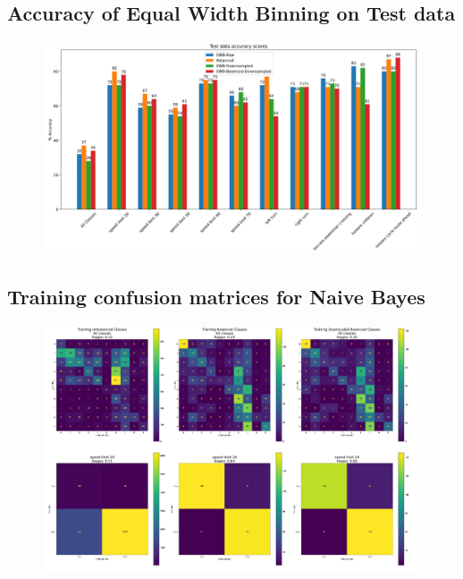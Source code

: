 \documentclass[11pt]{article}
\begin{document}
\begin{appendices}
\newpage
\subsection{Accuracy of Equal Width Binning on Test data}\label{BarChartEWBTest}
  \begin{figure}[h!] 
    \centering
    \includegraphics[scale=0.6]{Images/BarChartEWBTest.PNG}
\end{figure}


\newpage
\subsection{Training confusion matrices for Naive Bayes}\label{NaiveBayesConfMatTraining}
\begin{figure}[h!]
  \centering
  \includegraphics[scale=0.5]{Images/NaiveBayesConfMatTraining.PNG}
\end{figure}

\end{appendices}
\end{document}
